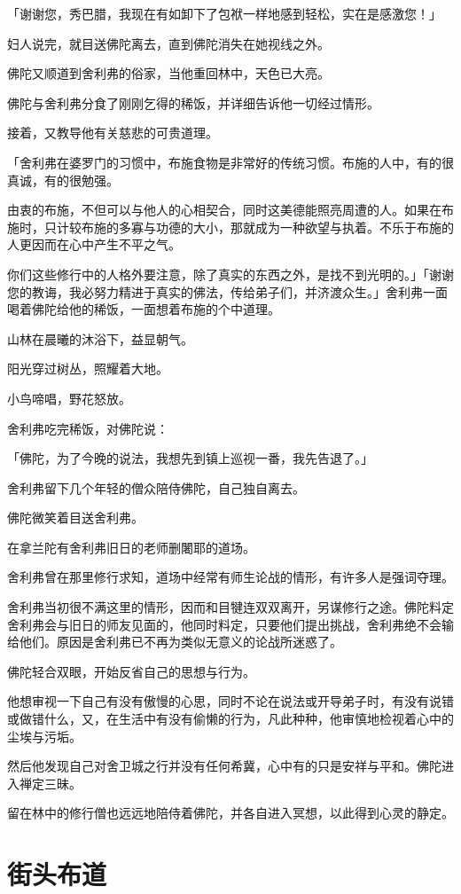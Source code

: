 \documentclass[twoside,openany]{book}
\begin{document}
「谢谢您，秀巴腊，我现在有如卸下了包袱一样地感到轻松，实在是感激您！」

妇人说完，就目送佛陀离去，直到佛陀消失在她视线之外。

佛陀又顺道到舍利弗的俗家，当他重回林中，天色已大亮。

佛陀与舍利弗分食了刚刚乞得的稀饭，并详细告诉他一切经过情形。

接着，又教导他有关慈悲的可贵道理。

「舍利弗在婆罗门的习惯中，布施食物是非常好的传统习惯。布施的人中，有的很真诚，有的很勉强。

由衷的布施，不但可以与他人的心相契合，同时这美德能照亮周遭的人。如果在布施时，只计较布施的多寡与功德的大小，那就成为一种欲望与执着。不乐于布施的人更因而在心中产生不平之气。

你们这些修行中的人格外要注意，除了真实的东西之外，是找不到光明的。」「谢谢您的教诲，我必努力精进于真实的佛法，传给弟子们，并济渡众生。」舍利弗一面喝着佛陀给他的稀饭，一面想着布施的个中道理。

山林在晨曦的沐浴下，益显朝气。

阳光穿过树丛，照耀着大地。

小鸟啼唱，野花怒放。

舍利弗吃完稀饭，对佛陀说：

「佛陀，为了今晚的说法，我想先到镇上巡视一番，我先告退了。」

舍利弗留下几个年轻的僧众陪侍佛陀，自己独自离去。

佛陀微笑着目送舍利弗。

在拿兰陀有舍利弗旧日的老师删闍耶的道场。

舍利弗曾在那里修行求知，道场中经常有师生论战的情形，有许多人是强词夺理。

舍利弗当初很不满这里的情形，因而和目犍连双双离开，另谋修行之途。佛陀料定舍利弗会与旧日的师友见面的，他同时料定，只要他们提出挑战，舍利弗绝不会输给他们。原因是舍利弗已不再为类似无意义的论战所迷惑了。

佛陀轻合双眼，开始反省自己的思想与行为。

他想审视一下自己有没有傲慢的心思，同时不论在说法或开导弟子时，有没有说错或做错什么，又，在生活中有没有偷懒的行为，凡此种种，他审慎地检视着心中的尘埃与污垢。

然后他发现自己对舍卫城之行并没有任何希冀，心中有的只是安祥与平和。佛陀进入禅定三昧。

留在林中的修行僧也远远地陪侍着佛陀，并各自进入冥想，以此得到心灵的静定。

\section{街头布道}\label{sec6.5}
\end{document}
